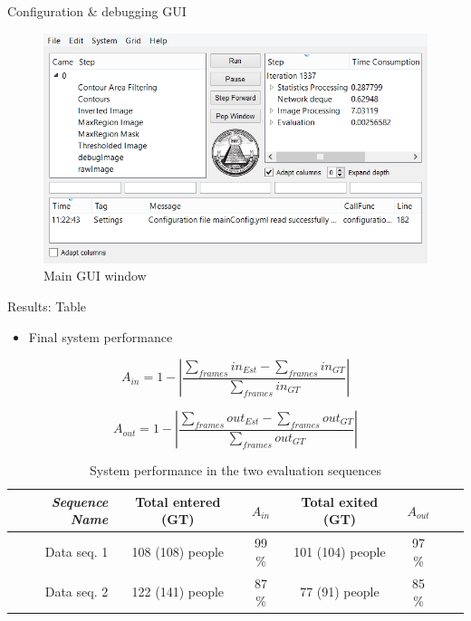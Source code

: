 \documentclass[final,hyperref={pdfpagelabels=false}]{beamer}
\begin{document}
\begin{frame}[t]
\begin{columns}[t]
\begin{column}{.465\textwidth}
\begin{block}{Configuration \& debugging GUI}
\begin{figure}
\includegraphics[width=0.9\linewidth]{PosterDebuggerCrop.png}
\caption{Main GUI window}
\end{figure}

\end{block}




\begin{block}{Results: Table}

\begin{itemize}
\item Final system performance
\end{itemize}

\begin{equation}
\label{eq:in_accuracy}
A_{in} = 1 - |\frac{\sum_{frames}{in_{Est}}-\sum_{frames}{in_{GT}}}{\sum_{frames}in_{GT}}|
\end{equation} 

\begin{equation}
\label{eq:out_accuracy}
A_{out} = 1 - |\frac{\sum_{frames}{out_{Est}}-\sum_{frames}out_{GT}}{\sum_{frames}out_{GT}}| 
\end{equation} 


\begin{table}[h]
\centering
	\begin{tabular}{r | c | c | c | c | c | c }
		\emph{Sequence Name}		&  Total entered (GT) & \emph{$A_{in}$} & Total exited (GT) & \emph{$A_{out}$} \\
		\hline \hline
		Data seq. 1			& 108 (108) people & 99 \% & 101 (104) people & 97 \% \\
		Data seq. 2			& 122 (141) people & 87 \% & 77 (91) people & 85 \%  \\
		\end{tabular}
	\caption{System performance in the two evaluation sequences}
\end{table}


\end{block}
\end{column}
\end{columns}
\end{frame}
\end{document}
